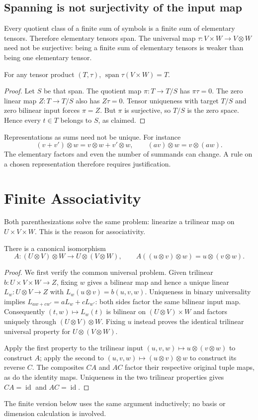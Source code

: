 \subsection{Spanning is not surjectivity of the input map}
Every quotient class of a finite sum of symbols is a finite sum of
elementary tensors. Therefore elementary tensors span. The universal map
$\tau:V\times W\to V\otimes W$ need not be surjective: being a finite
sum of elementary tensors is weaker than being one elementary tensor.
\begin{proposition}
For any tensor product $(T,\tau)$, $\operatorname{span}\tau(V\times W)=T$.
\end{proposition}
\begin{proof}
Let $S$ be that span. The quotient map $\pi:T\to T/S$ has $\pi\tau=0$.
The zero linear map $Z:T\to T/S$ also has $Z\tau=0$. Tensor uniqueness
with target $T/S$ and zero bilinear input forces $\pi=Z$. But $\pi$ is
surjective, so $T/S$ is the zero space. Hence every $t\in T$ belongs
to $S$, as claimed.
\end{proof}
Representations as sums need not be unique. For instance
\[
(v+v')\otimes w=v\otimes w+v'\otimes w,\qquad
(av)\otimes w=v\otimes(aw).
\]
The elementary factors and even the number of summands can change. A rule
on a chosen representation therefore requires justification.


\section{Finite Associativity}
\label{sec:tensor-associativity}
Both parenthesizations solve the same problem: linearize a trilinear
map on $U\times V\times W$. This is the reason for associativity.
\begin{theorem}[Associativity]
There is a canonical isomorphism
\[
A:(U\otimes V)\otimes W\longrightarrow U\otimes(V\otimes W),\qquad
A((u\otimes v)\otimes w)=u\otimes(v\otimes w).
\]
\end{theorem}
\begin{proof}
We first verify the common universal problem. Given trilinear
$b:U\times V\times W\to Z$, fixing $w$ gives a bilinear map and hence
a unique linear $L_w:U\otimes V\to Z$ with $L_w(u\otimes v)=b(u,v,w)$.
Uniqueness in binary universality implies
$L_{aw+cw'}=aL_w+cL_{w'}$: both sides factor the same bilinear input map.
Consequently $(t,w)\mapsto L_w(t)$ is bilinear on $(U\otimes V)\times W$
and factors uniquely through $(U\otimes V)\otimes W$.
Fixing $u$ instead proves the identical trilinear universal property for
$U\otimes(V\otimes W)$.

Apply the first property to the trilinear input
$(u,v,w)\mapsto u\otimes(v\otimes w)$ to construct $A$; apply the second
to $(u,v,w)\mapsto(u\otimes v)\otimes w$ to construct its reverse $C$.
The composites $CA$ and $AC$ factor their respective original tuple maps,
as do the identity maps. Uniqueness in the two trilinear properties gives
$CA=\operatorname{id}$ and $AC=\operatorname{id}$.
\end{proof}
The finite version below uses the same argument inductively; no basis or
dimension calculation is involved.

